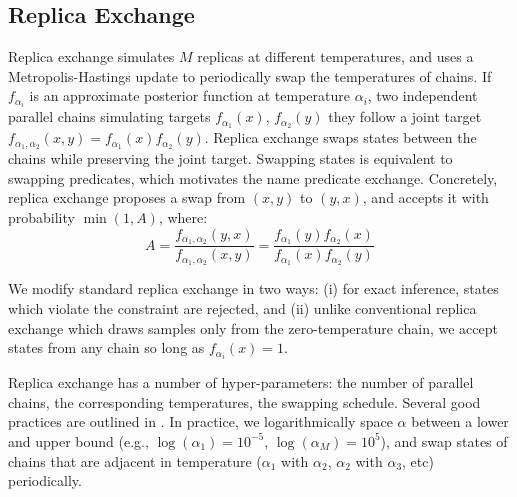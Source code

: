 \subsection{Replica Exchange}\label{replicaexchange}
Replica exchange simulates \citep{swendsen1986replica} $M$ replicas at different temperatures, and uses a Metropolis-Hastings update to  periodically swap the temperatures of chains.
If $f_{\alpha_i}$ is an approximate posterior function at temperature $\alpha_i$, two independent parallel chains simulating targets $f_{\alpha_1}(x)$, $f_{\alpha_2}(y)$ they follow a joint target $f_{\alpha_1, \alpha_2}(x,y) = f_{\alpha_1}(x)f_{\alpha_2}(y)$.
Replica exchange swaps states between the chains while preserving the joint target.
Swapping states is equivalent to swapping predicates, which motivates the name predicate exchange.
Concretely, replica exchange proposes a swap from $(x, y)$ to $(y, x)$, and accepts it with probability $\min(1, A)$, where:
\begin{equation}
A =  \frac{f_{\alpha_1, \alpha_2}(y,x)}{f_{\alpha_1, \alpha_2}(x,y)} = \frac{f_{\alpha_1}(y)f_{\alpha_2}(x)}{f_{\alpha_1}(x)f_{\alpha_2}(y)}
\end{equation}

We modify standard replica exchange in two ways: (i) for exact inference, states which violate the constraint are rejected, and (ii)
unlike conventional replica exchange which draws samples only from the zero-temperature chain, we accept states from any chain so long as $f_{\alpha_i}(x) = 1$.

Replica exchange has a number of hyper-parameters: the number of parallel chains, the corresponding temperatures, the swapping schedule.
Several good practices are outlined in \cite{earl2005parallel}.  In practice, we logarithmically space $\alpha$ between a lower and upper bound (e.g., $\log(\alpha_1) = 10^{-5}$, $\log(\alpha_M) = 10^5$), and swap states of chains that are adjacent in temperature ($\alpha_1$ with $\alpha_2$, $\alpha_2$ with $\alpha_3$, etc) periodically.


